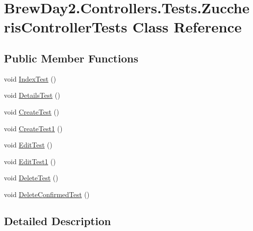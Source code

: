\hypertarget{class_brew_day2_1_1_controllers_1_1_tests_1_1_zuccheris_controller_tests}{}\section{Brew\+Day2.\+Controllers.\+Tests.\+Zuccheris\+Controller\+Tests Class Reference}
\label{class_brew_day2_1_1_controllers_1_1_tests_1_1_zuccheris_controller_tests}
\subsection*{Public Member Functions}
\begin{DoxyCompactItemize}
\item 
void \mbox{\hyperlink{class_brew_day2_1_1_controllers_1_1_tests_1_1_zuccheris_controller_tests_aa1673e428e46c68994999e339a118910}{Index\+Test}} ()
\item 
void \mbox{\hyperlink{class_brew_day2_1_1_controllers_1_1_tests_1_1_zuccheris_controller_tests_afc3a04b559605ea19d2b9cc98b6512ba}{Details\+Test}} ()
\item 
void \mbox{\hyperlink{class_brew_day2_1_1_controllers_1_1_tests_1_1_zuccheris_controller_tests_ac26233f434dc4f8d55e01509ac5bec01}{Create\+Test}} ()
\item 
void \mbox{\hyperlink{class_brew_day2_1_1_controllers_1_1_tests_1_1_zuccheris_controller_tests_a2bc1b16bf4bed03b5a8588560d439666}{Create\+Test1}} ()
\item 
void \mbox{\hyperlink{class_brew_day2_1_1_controllers_1_1_tests_1_1_zuccheris_controller_tests_ad838b63186acb60fb0a1610e15083a61}{Edit\+Test}} ()
\item 
void \mbox{\hyperlink{class_brew_day2_1_1_controllers_1_1_tests_1_1_zuccheris_controller_tests_a143d71724c121acd549331b77a284593}{Edit\+Test1}} ()
\item 
void \mbox{\hyperlink{class_brew_day2_1_1_controllers_1_1_tests_1_1_zuccheris_controller_tests_aa0361a99ebd2fd7b89465ad3e4260918}{Delete\+Test}} ()
\item 
void \mbox{\hyperlink{class_brew_day2_1_1_controllers_1_1_tests_1_1_zuccheris_controller_tests_adf557133253da9a7a20a4cbbe32085e9}{Delete\+Confirmed\+Test}} ()
\end{DoxyCompactItemize}


\subsection{Detailed Description}


